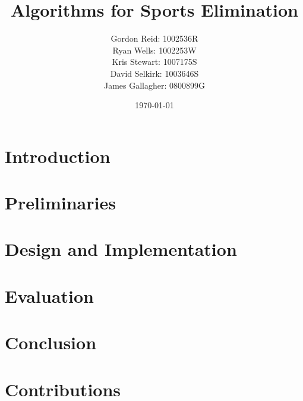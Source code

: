 \documentclass{l3proj}
\begin{document}
\title{Algorithms for Sports Elimination}

\author{
    Gordon Reid: 1002536R\\
    Ryan Wells: 1002253W\\
    Kris Stewart: 1007175S\\
    David Selkirk: 1003646S\\
    James Gallagher: 0800899G\\
}

\date{\today}

\maketitle

\begin{abstract}

\end{abstract}

\renewcommand{\abstractname}{Acknowledgements}

\begin{abstract}

\end{abstract}

\educationalconsent

\tableofcontents

\chapter{Introduction}


\chapter{Preliminaries}


\chapter{Design and Implementation}


\chapter{Evaluation}



\chapter{Conclusion}


\chapter{Contributions}


\appendix




\end{document}
